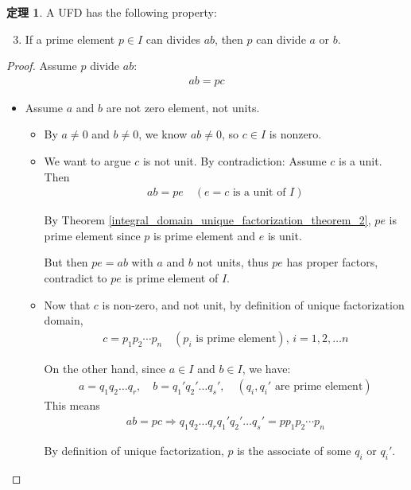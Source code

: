 \documentclass[utf8]{ctexbook}
\theoremstyle{definition}
\newtheorem{prototheorem}{定理}[section]
\newenvironment{theorem}
   {\colorlet{shadecolor}{red!30}\begin{shaded}\begin{prototheorem}}
   {\end{prototheorem}\end{shaded}}
\begin{document}
\begin{theorem}
A UFD has the following property:
\begin{enumerate}
\setcounter{enumi}{2}
\item{If a prime element $p \in I$ can divides $ab$, then $p$ can divide $a$ or $b$.}
\end{enumerate}
\end{theorem}

\begin{proof}
Assume $p$ divide $ab$:
\begin{align*}
ab = p c
\end{align*}

\begin{itemize}
\item{Assume $a$ and $b$ are not zero element, not units.}
\begin{itemize}
\item{By $a \neq 0$ and $b \neq 0$, we know $ab \neq 0$, so $c \in I$ is nonzero.}
\item{We want to argue $c$ is not unit. By contradiction: Assume $c$ is a unit. Then 
\begin{align*}
ab = p e \quad (e = c \mbox{  is a unit of } I)
\end{align*}

By Theorem \ref{integral_domain_unique_factorization_theorem_2}, $pe$ is prime element since $p$ is prime element and $e$ is unit.

But then $pe = ab$ with $a$ and $b$ not units, thus $pe$ has proper factors, contradict to $pe$ is prime element of $I$.
}
\item{Now that $c$ is non-zero, and not unit, by definition of unique factorization domain,
\begin{align*}
c = p_1 p_2 \cdots p_n \quad (p_i \mbox{ is prime element}), \, i = 1, 2, \ldots n
\end{align*}

On the other hand, since $a \in I$ and $b \in I$, we have:
\begin{align*}
a = q_1 q_2 \ldots q_r, \quad b = q_1 ' q_2 ' \ldots q_s ', \quad (q_i, q_i ' \mbox{ are prime element})
\end{align*}
This means
\begin{align*}
ab = pc \Longrightarrow q_1 q_2 \ldots q_r q_1 ' q_2 ' \ldots q_s ' = p p_1 p_2 \cdots p_n 
\end{align*}

By definition of unique factorization, $p$ is the associate of some $q_i$ or $q_i '$.

}
\end{itemize}
\end{itemize}
\end{proof}
\end{document}
